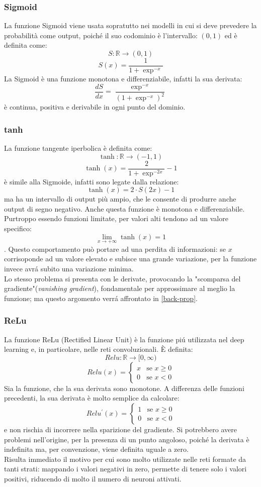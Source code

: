 \documentclass[a4paper,12pt,oneside]{book}
\begin{document}
\subsubsection{Sigmoid}
La funzione Sigmoid viene usata sopratutto nei modelli in cui si deve prevedere la probabilit\`{a} come output, poich\'{e} il suo codominio \`e l'intervallo: $(0,1)$ ed \`e definita come:
$$S:\mathbb{R}\longrightarrow(0,1)$$
$$S(x)=\frac{1}{1+\exp^{-x}}$$
La Sigmoid \`e una funzione monotona e differenziabile, infatti la sua derivata:
$$\frac{dS}{dx}=\frac{\exp^{-x}}{(1+\exp^{-x})^2}$$
\`e continua, positiva e derivabile in  ogni punto del dominio.
\newpage
\subsubsection{tanh}
La funzione tangente iperbolica \`e definita come: $$\tanh:\mathbb{R}\longrightarrow(-1,1)$$ 
$$ \tanh(x)=\frac{2}{1+\exp^{-2x}} - 1$$ 
\`e simile alla Sigmoide, infatti sono legate dalla relazione:
$$
\tanh(x)=2 \cdot S(2x)-1
$$
ma ha un intervallo di output pi\`{u} ampio, che le consente di produrre anche output di segno negativo. Anche questa funzione \`e monotona e differenziabile.\\
Purtroppo essendo funzioni limitate, per valori alti tendono ad un valore specifico: $$\lim_{x \to +\infty} \tanh(x)=1$$. Questo comportamento pu\`{o} portare ad una perdita di informazioni: se $x$ corrisoponde ad un valore elevato e subisce una grande variazione, per la funzione invece avr\'{a} subito una variazione minima.\\
Lo stesso problema si presenta con le derivate, provocando la "scomparsa del gradiente"(\textit{vanishing gradient}), fondamentale per approssimare al meglio la funzione; ma questo argomento verr\'{a} affrontato in \ref{back-prop}.
\subsubsection{ReLu}
La funzione ReLu (Rectified Linear Unit) \`e la funzione pi\'{u} utilizzata nel deep learning e, in particolare, nelle reti convoluzionali. \`{E} definita:
$$Relu:\mathbb{R}\longrightarrow [0,\infty)$$
$$
Relu(x)=
\left\{
\begin{array}{rl}
x & \mbox{se } x \geq 0 \\
0 & \mbox{se } x < 0
\end{array}
\right.
$$
Sia la funzione, che la sua derivata sono monotone. A differenza delle funzioni precedenti, la sua derivata \`e molto semplice da calcolare:
$$
Relu^{\prime}(x)=
\left\{
\begin{array}{rl}
1 & \mbox{se } x \geq 0 \\
0 & \mbox{se } x < 0
\end{array}
\right.
$$
e non rischia di incorrere nella sparizione del gradiente. Si potrebbero avere problemi nell'origine, per la presenza di un punto angoloso, poich\'{e} la derivata \`e indefinita ma, per convenzione, viene definita uguale a zero.\\
Risulta immediato il motivo per cui sono molto utilizzate nelle reti formate da tanti strati: mappando i valori negativi in zero, permette di tenere solo i valori positivi, riducendo di molto il numero di neuroni attivati.
\newpage
\end{document}

